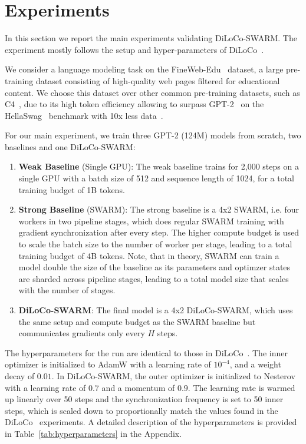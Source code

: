 \documentclass[conference, 10pt]{IEEEtran}
\begin{document}

\section{Experiments}
\label{sec:experiments}

In this section we report the main experiments validating DiLoCo-SWARM. The experiment
mostly follows the setup and hyper-parameters of DiLoCo~\cite{douillard2023}.

We consider a language modeling task on the FineWeb-Edu~\cite{penedo2024}
dataset, a large pre-training dataset consisting of high-quality web pages
filtered for educational content. We choose this dataset over other common
pre-training datasets, such as C4~\cite{}, due to its high token efficiency
allowing to surpass GPT-2~\cite{radford2019} on the HellaSwag~\cite{zellers2019}
benchmark with 10x less data~\cite{karpathy2024}.

For our main experiment, we train three GPT-2 (124M) models from scratch, two
baselines and one DiLoCo-SWARM:

\begin{enumerate}
  \item \textbf{Weak Baseline} (Single GPU): The weak baseline trains for 2,000
  steps on a single GPU with a batch size of 512 and sequence length of 1024,
  for a total training budget of 1B tokens. 
  \item \textbf{Strong Baseline} (SWARM): The strong baseline is a 4x2 SWARM,
  i.e. four workers in two pipeline stages, which does regular SWARM training
  with gradient synchronization after every step. The higher compute budget is
  used to scale the batch size to the number of worker per stage, leading to a
  total training budget of 4B tokens. Note, that in theory, SWARM can train a
  model double the size of the baseline as its parameters and optimzer states
  are sharded across pipeline stages, leading to a total model size that scales
  with the number of stages. 
  \item \textbf{DiLoCo-SWARM}: The final model is a 4x2 DiLoCo-SWARM, which uses
  the same setup and compute budget as the SWARM baseline but communicates
  gradients only every $H$ steps.
\end{enumerate}

The hyperparameters for the run are identical to those in
DiLoCo~\cite{douillard2023}. The inner optimizer is initialized to AdamW with a
learning rate of $10^{-4}$, and a weight decay of $0.01$. In DiLoCo-SWARM, the
outer optimizer is initialized to Nesterov with a learning rate of $0.7$ and a
momentum of $0.9$. The learning rate is warmed up linearly over 50 steps and the
synchronization frequency is set to 50 inner steps, which is scaled down to
proportionally match the values found in the DiLoCo~\cite{douillard2023}
experiments. A detailed description of the hyperparameters is provided in
Table~\ref{tab:hyperparameters} in the Appendix.
\end{document}
